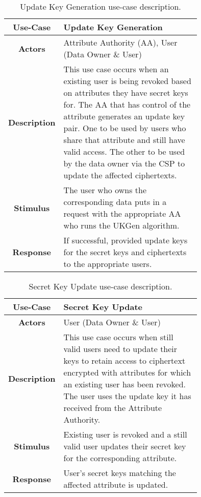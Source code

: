 \begin{table}[]
	\centering
	\begin{tabular}{|c|p{0.75\linewidth}|}
		\hline
		\textbf{Use-Case}    & Update Key Generation                                   \\ \hline
		\textbf{Actors}      & Attribute Authority (AA), User (Data Owner \& User)                        \\ \hline
		\textbf{Description} & This use case occurs when an existing user is being revoked based on attributes they have secret keys for. The AA that has control of the attribute generates an update key pair. One to be used by users who share that attribute and still have valid access. The other to be used by the data owner via the CSP to update the affected ciphertexts. \\ \hline
		\textbf{Stimulus}    & The user who owns the corresponding data puts in a request with the appropriate AA who runs the UKGen algorithm.                   \\ \hline
		\textbf{Response}    & If successful, provided update keys for the secret keys and ciphertexts to the appropriate users.             \\ \hline
	\end{tabular}
	\caption{Update Key Generation use-case description.}
	\label{tab:use_case_ukeygen}
\end{table}

\begin{table}[]
	\centering
	\begin{tabular}{|c|p{0.75\linewidth}|}
		\hline
		\textbf{Use-Case}    & Secret Key Update                                  \\ \hline
		\textbf{Actors}      & User (Data Owner \& User)                        \\ \hline
		\textbf{Description} & This use case occurs when still valid users need to update their keys to retain access to ciphertext encrypted with attributes for which an existing user has been revoked. The user uses the update key it has received from the Attribute Authority. \\ \hline
		\textbf{Stimulus}    & Existing user is revoked and a still valid user updates their secret key for the corresponding attribute.                     \\ \hline
		\textbf{Response}    & User's secret keys matching the affected attribute is updated.             \\ \hline
	\end{tabular}
	\caption{Secret Key Update use-case description.}
	\label{tab:use_case_skupd}
\end{table}

